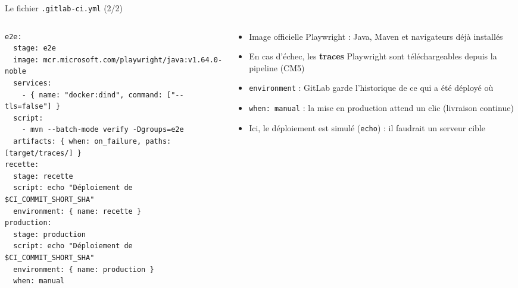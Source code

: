 \documentclass[aspectratio=169,10pt]{beamer}
\begin{document}
\begin{frame}[fragile]{Le fichier \texttt{.gitlab-ci.yml} (2/2)}
  \begin{columns}[T]
    \begin{column}{0.6\textwidth}
\begin{lstlisting}[style=yml]
e2e:
  stage: e2e
  image: mcr.microsoft.com/playwright/java:v1.64.0-noble
  services:
    - { name: "docker:dind", command: ["--tls=false"] }
  script:
    - mvn --batch-mode verify -Dgroups=e2e
  artifacts: { when: on_failure, paths: [target/traces/] }
recette:
  stage: recette
  script: echo "Déploiement de $CI_COMMIT_SHORT_SHA"
  environment: { name: recette }
production:
  stage: production
  script: echo "Déploiement de $CI_COMMIT_SHORT_SHA"
  environment: { name: production }
  when: manual
\end{lstlisting}
    \end{column}
    \begin{column}{0.37\textwidth}
      \small
      \begin{itemize}
        \item Image officielle Playwright : Java, Maven et navigateurs déjà installés
        \item En cas d'échec, les \textbf{traces} Playwright sont téléchargeables depuis la pipeline (CM5)
        \item \texttt{environment} : GitLab garde l'historique de ce qui a été déployé où
        \item \texttt{when: manual} : la mise en production attend un clic (livraison continue)
        \item Ici, le déploiement est simulé (\texttt{echo}) : il faudrait un serveur cible
      \end{itemize}
    \end{column}
  \end{columns}
\end{frame}
\end{document}
